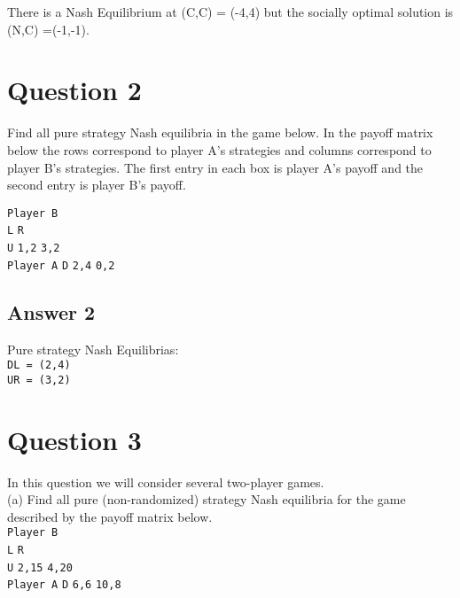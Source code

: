 \documentclass[twoside]{article}
\begin{document}
There is a Nash Equilibrium at (C,C) = (-4,4) but the socially optimal solution is (N,C) =(-1,-1).

\section{Question 2}
Find all pure strategy Nash equilibria in the game below. In the payoff matrix below the rows correspond to player A's strategies and columns correspond to player B's strategies. The first entry in each box is player A's payoff and the second entry is player B's payoff.

\hspace*{40mm}\texttt{Player B }\\
\hspace*{40mm}\texttt{L} \hspace*{15mm}\texttt{R}\\
\hspace*{24mm}\texttt{U} \hspace{12mm}\texttt{1,2} \hspace{12mm}\texttt{3,2}\\
\texttt{Player A} \hspace*{8mm}\texttt{D} \hspace{12mm}\texttt{2,4} \hspace{12mm}\texttt{0,2}\\

\subsection{Answer 2}

Pure strategy Nash Equilibrias: \\
\texttt{DL = (2,4)}\\
\texttt{UR = (3,2)}

\section{Question 3}
In this question we will consider several two-player games.\\

(a) Find all pure (non-randomized) strategy Nash equilibria for the game described by the payoff matrix below.\\

\hspace*{40mm}\texttt{Player B }\\
\hspace*{40mm}\texttt{L} \hspace*{15mm}\texttt{R}\\
\hspace*{24mm}\texttt{U} \hspace{11mm}\texttt{2,15} \hspace{11mm}\texttt{4,20}\\
\texttt{Player A} \hspace*{8mm}\texttt{D} \hspace{11mm}\texttt{6,6} \hspace{12mm}\texttt{10,8}\\
\end{document}
